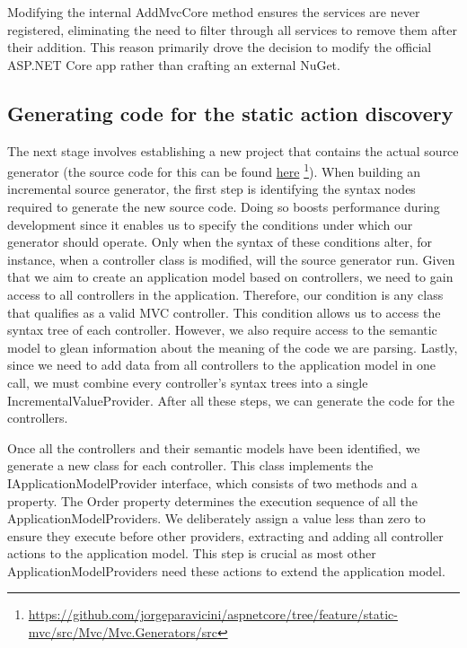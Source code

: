 Modifying the internal AddMvcCore method ensures the services are never registered, eliminating the need to filter through all services to remove them after their addition. This reason primarily drove the decision to modify the official ASP.NET Core app rather than crafting an external NuGet.

\subsection{Generating code for the static action discovery}

The next stage involves establishing a new project that contains the actual source generator (the source code for this can be found \href{https://github.com/jorgeparavicini/aspnetcore/tree/feature/static-mvc/src/Mvc/Mvc.Generators/src}{here} \footnote{\url{https://github.com/jorgeparavicini/aspnetcore/tree/feature/static-mvc/src/Mvc/Mvc.Generators/src}}). When building an incremental source generator, the first step is identifying the syntax nodes required to generate the new source code. Doing so boosts performance during development since it enables us to specify the conditions under which our generator should operate. Only when the syntax of these conditions alter, for instance, when a controller class is modified, will the source generator run. Given that we aim to create an application model based on controllers, we need to gain access to all controllers in the application. Therefore, our condition is any class that qualifies as a valid MVC controller. This condition allows us to access the syntax tree of each controller. However, we also require access to the semantic model to glean information about the meaning of the code we are parsing. Lastly, since we need to add data from all controllers to the application model in one call, we must combine every controller's syntax trees into a single IncrementalValueProvider. After all these steps, we can generate the code for the controllers.

Once all the controllers and their semantic models have been identified, we generate a new class for each controller. This class implements the IApplicationModelProvider interface, which consists of two methods and a property. The Order property determines the execution sequence of all the ApplicationModelProviders. We deliberately assign a value less than zero to ensure they execute before other providers, extracting and adding all controller actions to the application model. This step is crucial as most other ApplicationModelProviders need these actions to extend the application model.

